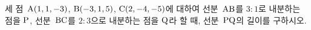 세 점~$\mathrm{A}(1{,}\mkern3mu\mathopen{}1{,}\mkern3mu\mathopen{}-3)$, $\mathrm{B}(-3{,}\mkern3mu\mathopen{}1{,}\mkern3mu\mathopen{}5)$, $\mathrm{C}(2{,}\mkern3mu\mathopen{}-4{,}\mkern3mu\mathopen{}-5)$에 대하여 선분~$\mathrm{AB}$를 $3:1$로 내분하는 점을 $\mathrm{P}$, 선분~$\mathrm{BC}$를 $2:3$으로 내분하는 점을 $\mathrm{Q}$라 할 때, 선분~$\mathrm{PQ}$의 길이를 구하시오.
